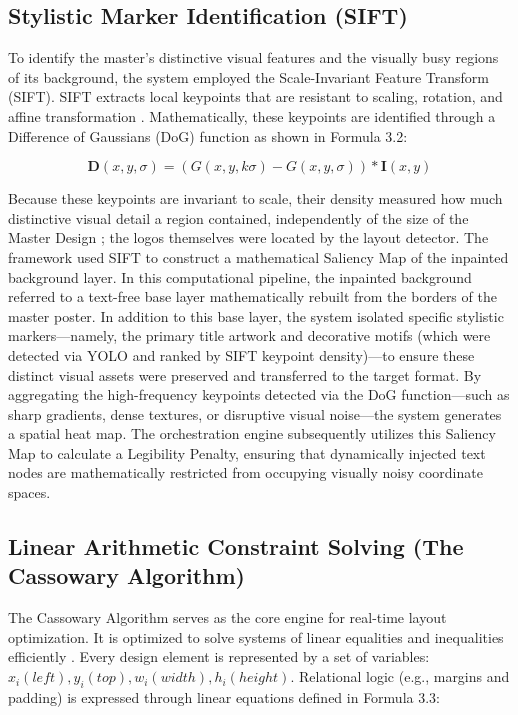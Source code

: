 \begin{refsection}
\subsection{Stylistic Marker Identification (SIFT)}
To identify the master's distinctive visual features and the visually busy regions of its background, the system employed the Scale-Invariant Feature Transform (SIFT). SIFT extracts local keypoints that are resistant to scaling, rotation, and affine transformation \cite{Shaharom2023SIFT}. Mathematically, these keypoints are identified through a Difference of Gaussians (DoG) function as shown in Formula 3.2:

\begin{center}
\begin{minipage}{0.8\textwidth}
\begin{equation}
\mathbf{D}(x,y,\sigma)=(G(x,y,k\sigma)-G(x,y,\sigma))\ast \mathbf{I}(x,y)
\end{equation}
\centering
\end{minipage}
\end{center}

Because these keypoints are invariant to scale, their density measured how much distinctive visual detail a region contained, independently of the size of the Master Design \cite{Shaharom2023SIFT}; the logos themselves were located by the layout detector. The framework used SIFT to construct a mathematical Saliency Map of the inpainted background layer. In this computational pipeline, the inpainted background referred to a text-free base layer mathematically rebuilt from the borders of the master poster. In addition to this base layer, the system isolated specific stylistic markers—namely, the primary title artwork and decorative motifs (which were detected via YOLO and ranked by SIFT keypoint density)—to ensure these distinct visual assets were preserved and transferred to the target format. By aggregating the high-frequency keypoints detected via the DoG function---such as sharp gradients, dense textures, or disruptive visual noise---the system generates a spatial heat map. The orchestration engine subsequently utilizes this Saliency Map to calculate a Legibility Penalty, ensuring that dynamically injected text nodes are mathematically restricted from occupying visually noisy coordinate spaces.

\subsection{Linear Arithmetic Constraint Solving (The Cassowary Algorithm)}
The Cassowary Algorithm serves as the core engine for real-time layout optimization. It is optimized to solve systems of linear equalities and inequalities efficiently \cite{Badros2001Cassowary}. Every design element is represented by a set of variables: $x_i\left(left\right),y_i\left(top\right),w_i\left(width\right),h_i\left(height\right).$ Relational logic (e.g., margins and padding) is expressed through linear equations defined in Formula 3.3:


\end{refsection}
